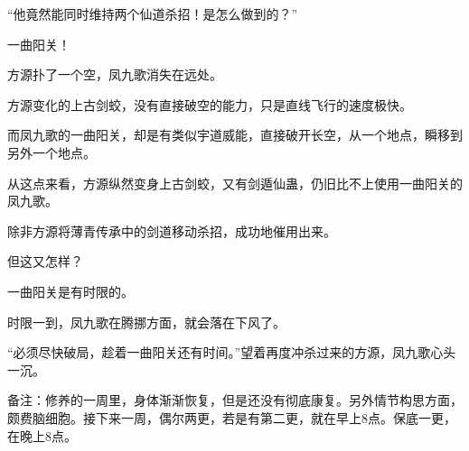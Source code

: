 \begin{this_body}
“他竟然能同时维持两个仙道杀招！是怎么做到的？”

一曲阳关！

方源扑了一个空，凤九歌消失在远处。

方源变化的上古剑蛟，没有直接破空的能力，只是直线飞行的速度极快。

而凤九歌的一曲阳关，却是有类似宇道威能，直接破开长空，从一个地点，瞬移到另外一个地点。

从这点来看，方源纵然变身上古剑蛟，又有剑遁仙蛊，仍旧比不上使用一曲阳关的凤九歌。

除非方源将薄青传承中的剑道移动杀招，成功地催用出来。

但这又怎样？

一曲阳关是有时限的。

时限一到，凤九歌在腾挪方面，就会落在下风了。

“必须尽快破局，趁着一曲阳关还有时间。”望着再度冲杀过来的方源，凤九歌心头一沉。

备注：修养的一周里，身体渐渐恢复，但是还没有彻底康复。另外情节构思方面，颇费脑细胞。接下来一周，偶尔两更，若是有第二更，就在早上8点。保底一更，在晚上8点。

\end{this_body}

